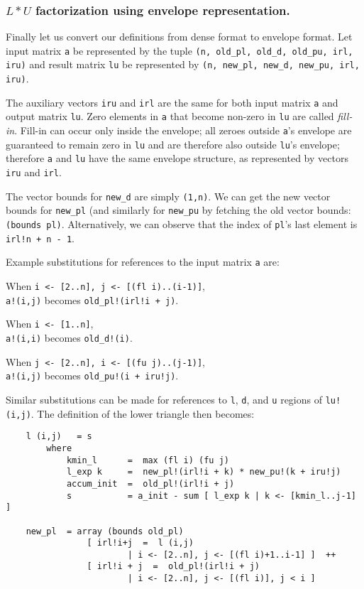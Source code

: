 \subsubsection{$L*U$ factorization using envelope representation.}

Finally let us convert our definitions from dense format to envelope
format.  Let input matrix {\tt a} be represented by the tuple {\tt (n,
old\_pl, old\_d, old\_pu, irl, iru)} and result matrix {\tt lu} be
represented by {\tt (n, new\_pl, new\_d, new\_pu, irl, iru)}.

The auxiliary vectors {\tt iru} and {\tt irl} are the same for
both input matrix {\tt a} and output matrix {\tt lu}.  Zero elements
in {\tt a} that become non-zero in {\tt lu} are called {\em fill-in}.
Fill-in can occur only inside the envelope; all zeroes outside
{\tt a}'s envelope are guaranteed to remain zero in {\tt lu} and
are therefore also outside {\tt lu}'s envelope; therefore {\tt a}
and {\tt lu} have the same envelope structure, as represented
by vectors {\tt iru} and {\tt irl}.

The vector bounds for {\tt new\_d} are simply {\tt (1,n)}.
We can get the new vector bounds for {\tt new\_pl} (and similarly
for {\tt new\_pu} by fetching the old vector bounds: {\tt (bounds pl)}.
Alternatively, we can observe that the index of {\tt pl}'s last element
is {\tt irl!n + n - 1}.

Example substitutions for references to the input matrix {\tt a} are:
\begin{list}{}
    \item When {\tt i <- [2..n], j <- [(fl i)..(i-1)]},     \\
        {\tt a!(i,j)} becomes {\tt old\_pl!(irl!i + j)}.
    \item When {\tt i <- [1..n]},                           \\
        {\tt a!(i,i)} becomes {\tt old\_d!(i)}.
    \item When {\tt j <- [2..n], i <- [(fu j)..(j-1)]},     \\
        {\tt a!(i,j)} becomes {\tt old\_pu!(i + iru!j)}.
\end{list}
Similar substitutions can be made for references to
{\tt l}, {\tt d}, and {\tt u} regions of {\tt lu!(i,j)}.
The definition of the lower triangle then becomes:
\begin{verbatim}
    l (i,j)   = s
        where
            kmin_l      =  max (fl i) (fu j)
            l_exp k     =  new_pl!(irl!i + k) * new_pu!(k + iru!j)
            accum_init  =  old_pl!(irl!i + j)
            s           = a_init - sum [ l_exp k | k <- [kmin_l..j-1] ]

    new_pl  = array (bounds old_pl)
                [ irl!i+j  =  l (i,j)
                        | i <- [2..n], j <- [(fl i)+1..i-1] ]  ++
                [ irl!i + j  =  old_pl!(irl!i + j)
                        | i <- [2..n], j <- [(fl i)], j < i ]
\end{verbatim}

